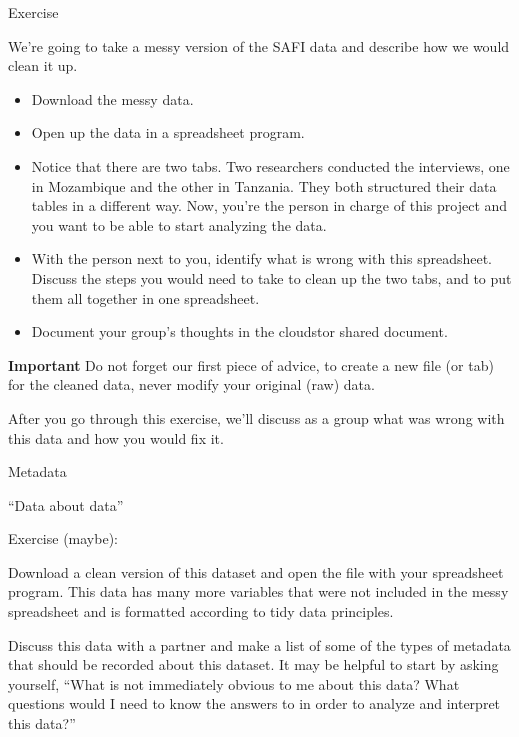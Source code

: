 \documentclass[aspectratio=43, 11pt]{beamer} %
\begin{document}
\begin{frame}{Exercise}

We’re going to take a messy version of the SAFI data and describe how we would clean it up.

\begin{itemize}[label=\textbullet]

\item Download the messy data.
\item Open up the data in a spreadsheet program.
\item Notice that there are two tabs. Two researchers conducted the interviews, one in Mozambique and the other in Tanzania. They both structured their data tables in a different way. Now, you’re the person in charge of this project and you want to be able to start analyzing the data.
\item With the person next to you, identify what is wrong with this spreadsheet. Discuss the steps you would need to take to clean up the two tabs, and to put them all together in one spreadsheet.
\item Document your group's thoughts in the cloudstor shared document.
\end{itemize}

\textbf{Important} Do not forget our first piece of advice, to create a new file (or tab) for the cleaned data, never modify your original (raw) data.

After you go through this exercise, we’ll discuss as a group what was wrong with this data and how you would fix it.

\end{frame}

\begin{frame}{Metadata}

``Data about data''

Exercise (maybe):

Download a clean version of this dataset and open the file with your spreadsheet program. This data has many more variables that were not included in the messy spreadsheet and is formatted according to tidy data principles.

Discuss this data with a partner and make a list of some of the types of metadata that should be recorded about this dataset. It may be helpful to start by asking yourself, “What is not immediately obvious to me about this data? What questions would I need to know the answers to in order to analyze and interpret this data?”


\end{frame}
\end{document}
